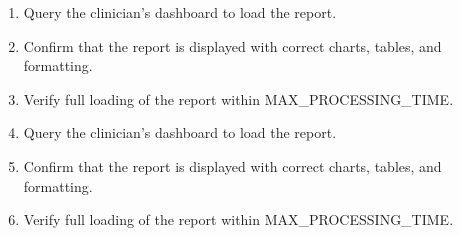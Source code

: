 \documentclass[12pt, titlepage]{article}
\begin{document}
\begin{itemize}
\begin{mdframed}[linewidth=0.5mm]
\begin{enumerate}[noitemsep]
        \item Query the clinician’s dashboard to load the report.
        \item Confirm that the report is displayed with correct charts, tables, and formatting.
        \item Verify full loading of the report within MAX\_PROCESSING\_TIME.
        \item Query the clinician’s dashboard to load the report.
        \item Confirm that the report is displayed with correct charts, tables, and formatting.
        \item Verify full loading of the report within MAX\_PROCESSING\_TIME.
      \end{enumerate}
  \end{mdframed}


\end{itemize}
\end{document}

